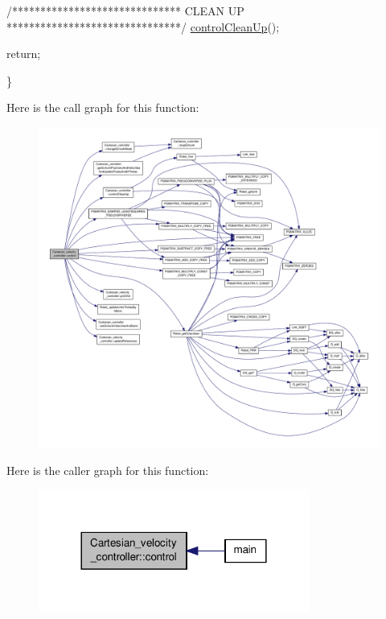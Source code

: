 \begin{DoxyCode}
        \textcolor{comment}{/******************************}
\textcolor{comment}{                        CLEAN UP}
\textcolor{comment}{        *******************************/}
        \hyperlink{classCartesian__controller_a8c0f0b41de9f4f8b2e3aa327e7c6b50c}{controlCleanUp}();

        \textcolor{keywordflow}{return};

\}
\end{DoxyCode}


Here is the call graph for this function\-:\nopagebreak
\begin{figure}[H]
\begin{center}
\leavevmode
\includegraphics[width=350pt]{classCartesian__velocity__controller_a249bd167cd995e16906731172d1bc516_cgraph}
\end{center}
\end{figure}




Here is the caller graph for this function\-:\nopagebreak
\begin{figure}[H]
\begin{center}
\leavevmode
\includegraphics[width=252pt]{classCartesian__velocity__controller_a249bd167cd995e16906731172d1bc516_icgraph}
\end{center}
\end{figure}


